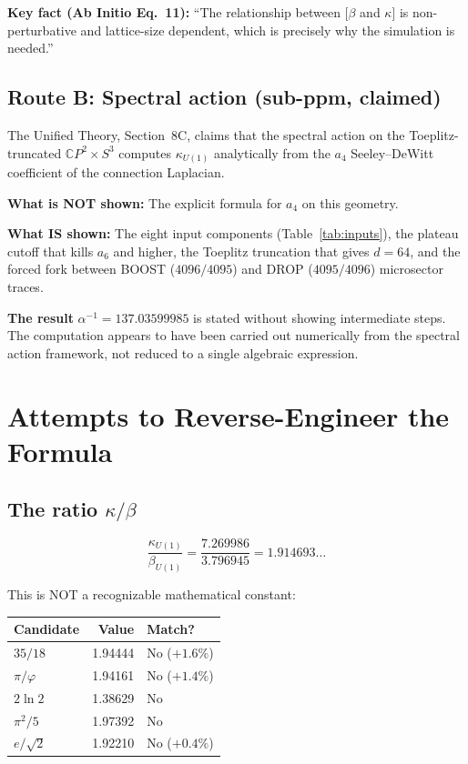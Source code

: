 \documentclass[12pt,a4paper]{article}
\theoremstyle{definition}
\begin{document}
\textbf{Key fact (Ab Initio Eq.~11):} ``The relationship between
[$\beta$ and $\kappa$] is non-perturbative and lattice-size dependent,
which is precisely why the simulation is needed.''

\subsection{Route B: Spectral action (sub-ppm, claimed)}

The Unified Theory, Section~8C, claims that the spectral action on the
Toeplitz-truncated $\mathbb{C}P^2 \times S^3$ computes $\kappa_{U(1)}$
analytically from the $a_4$ Seeley--DeWitt coefficient of the connection
Laplacian.

\textbf{What is NOT shown:} The explicit formula for $a_4$ on this geometry.

\textbf{What IS shown:} The eight input components (Table~\ref{tab:inputs}),
the plateau cutoff that kills $a_6$ and higher, the Toeplitz truncation that
gives $d = 64$, and the forced fork between BOOST ($4096/4095$) and DROP
($4095/4096$) microsector traces.

\textbf{The result} $\alpha^{-1} = 137.03599985$ is stated without showing
intermediate steps. The computation appears to have been carried out
numerically from the spectral action framework, not reduced to a single
algebraic expression.

\section{Attempts to Reverse-Engineer the Formula}
\label{sec:reverse}

\subsection{The ratio $\kappa/\beta$}

\begin{equation}
\frac{\kappa_{U(1)}}{\beta_{U(1)}} = \frac{7.269986}{3.796945} = 1.914693\ldots
\end{equation}

This is NOT a recognizable mathematical constant:
\begin{center}
\renewcommand{\arraystretch}{1.2}
\begin{tabular}{lrl}
\toprule
Candidate & Value & Match? \\
\midrule
$35/18$ & 1.94444 & No ($+1.6\%$) \\
$\pi/\varphi$ & 1.94161 & No ($+1.4\%$) \\
$2\ln 2$ & 1.38629 & No \\
$\pi^2/5$ & 1.97392 & No \\
$e/\sqrt{2}$ & 1.92210 & No ($+0.4\%$) \\
\bottomrule
\end{tabular}
\end{center}
\end{document}
